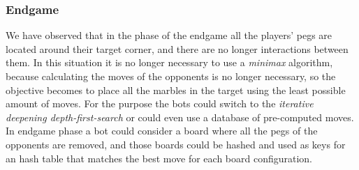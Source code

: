 \documentclass[a4paper,11pt]{article}
\begin{document}
\subsubsection{Endgame}
We have observed that in the phase of the endgame all the players' pegs are
located around their target corner, and there are no longer interactions between
them.
In this situation it is no longer necessary to use a \emph{minimax} algorithm,
because calculating the moves of the opponents is no longer necessary, so the
objective becomes to place all the marbles in the target using the least
possible amount of moves.
For the purpose the bots could switch to the \emph{iterative deepening
depth-first-search} or could even use a database of pre-computed moves.
In endgame phase a bot could consider a board where all the pegs of the
opponents are removed, and those boards could be hashed and used as keys for an
hash table that matches the best move for each board configuration.





\end{document}
